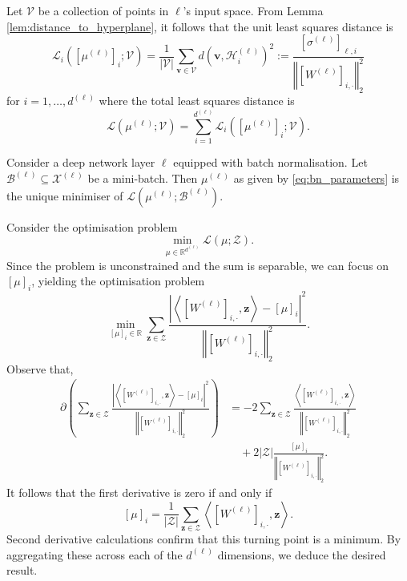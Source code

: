 Let $\mathcal{V}$ be a collection of points in $\ell$'s input space. From Lemma \ref{lem:distance_to_hyperplane}, it follows that the unit least squares distance is 
\begin{equation}\label{eq:unit_least_squares}
    \mathcal{L}_i\left(\left[\mu^{(\ell)}\right]_i;\mathcal{V}\right)=\frac{1}{\vert\mathcal{V}\vert}\sum_{\mathbf{v}\in\mathcal{V}}d\left(\mathbf{v},\mathcal{H}^{(\ell)}_i\right)^2:=\frac{\left[\sigma^{(\ell)}\right]_{\ell,i}}{\left\Vert\left[W^{(\ell)}\right]_{i,\cdot}\right\Vert_2^2}
\end{equation}
for $i=1,\dots,d^{(\ell)}$ where the total least squares distance is $$\mathcal{L}\left(\mu^{(\ell)};\mathcal{V}\right)=\sum_{i=1}^{d^{(\ell)}}\mathcal{L}_i\left(\left[\mu^{(\ell)}\right]_i;\mathcal{V}\right).$$

\begin{theorem}\label{thm:minimising_tls}
    Consider a deep network layer $\ell$ equipped with batch normalisation. Let $\mathcal{B}^{(\ell)}\subseteq\mathcal{X}^{(\ell)}$ be a mini-batch. Then $\mu^{(\ell)}$ as given by \eqref{eq:bn_parameters} is the unique minimiser of $\mathcal{L}\left(\mu^{(\ell)};\mathcal{B}^{(\ell)}\right)$.
\end{theorem}

\begin{tproof}
    Consider the optimisation problem $$\min_{\mu\in\mathbb{R}^{d^{(\ell)}}}\mathcal{L}\left(\mu;\mathcal{Z}\right).$$Since the problem is unconstrained and the sum is separable, we can focus on $[\mu]_i$, yielding the optimisation problem $$\min_{[\mu]_i\in\mathbb{R}}\sum_{\mathbf{z}\in\mathcal{Z}}\frac{\left\vert\left\langle\left[W^{(\ell)}\right]_{i,\cdot},\mathbf{z}\right\rangle-[\mu]_i\right\vert^2}{\left\Vert\left[W^{(\ell)}\right]_{i,\cdot}\right\Vert_2^2}.$$Observe that, 
    \begin{align*}
        \partial\left(\sum_{\mathbf{z}\in\mathcal{Z}}\frac{\left\vert\left\langle\left[W^{(\ell)}\right]_{i,\cdot},\mathbf{z}\right\rangle-[\mu]_i\right\vert^2}{\left\Vert\left[W^{(\ell)}\right]_{i,\cdot}\right\Vert_2^2}\right)&=-2\sum_{\mathbf{z}\in\mathcal{Z}}\frac{\left\langle\left[W^{(\ell)}\right]_{i,\cdot},\mathbf{z}\right\rangle}{\left\Vert\left[W^{(\ell)}\right]_{i,\cdot}\right\Vert_2^2}\\&\quad+2\vert\mathcal{Z}\vert\frac{[\mu]_i}{\left\Vert\left[W^{(\ell)}\right]_{i,\cdot}\right\Vert_2^2}.
    \end{align*}
    It follows that the first derivative is zero if and only if $$[\mu]_i=\frac{1}{\vert\mathcal{Z}\vert}\sum_{\mathbf{z}\in\mathcal{Z}}\left\langle\left[W^{(\ell)}\right]_{i,\cdot},\mathbf{z}\right\rangle.$$Second derivative calculations confirm that this turning point is a minimum. By aggregating these across each of the $d^{(\ell)}$ dimensions, we deduce the desired result.
\end{tproof}

